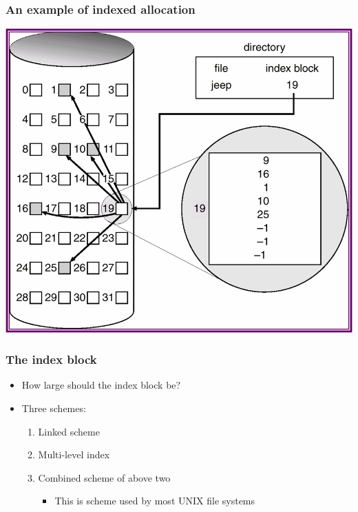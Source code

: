 \documentclass[CJKutf8,xcolor=pdftex,dvipsnames,table]{beamer}
\begin{document}
\begin{CJK*}{UTF8}{song}
  \begin{frame}
    \frametitle{An example of indexed allocation} \pause
    \begin{center}
      \includegraphics[scale=.5]{v6f12-8}
    \end{center}
  \end{frame}
  
  \begin{frame}
    \frametitle{The index block} \pause
    \begin{itemize}
    \item How large should the index block be? \pause
    \item Three schemes: \pause
      \begin{enumerate}\parskip=0pt
      \item Linked scheme \pause
      \item Multi-level index \pause
      \item Combined scheme of above two \pause
        \begin{itemize}\parskip=0pt
        \item This is scheme used by most UNIX file systems
        \end{itemize}
      \end{enumerate}
    \end{itemize}
  \end{frame}
  

\end{CJK*}
\end{document}
